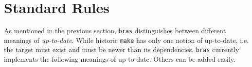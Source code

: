 \documentclass[12pt]{article}
\newcommand{\bras}{\texttt{bras}}
\newcommand{\Bras}{\texttt{Bras}}
\newcommand{\make}{\texttt{make}}
\begin{document}






\section{Standard Rules}
\label{SecStandardRules}
As mentioned in the previous section, \bras{} distinguishes between
different meanings of \textit{up-to-date}. While historic
\make{} has only one notion of up-to-date, i.e. the target must exist
and must be newer than its dependencies, \bras{} currently implements
the following meanings of up-to-date. Others can be added
easily.
\end{document}
